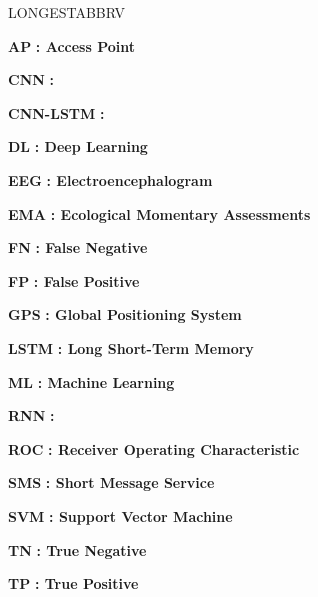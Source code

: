 \begin{theglossary}{LONGESTABBRV}
\item[\bf AP] \bf{:} \normalfont Access Point
\item[\bf CNN] \bf{:} 
\item[\bf CNN-LSTM] \bf{:} 
\item[\bf DL] \bf{:} \normalfont Deep Learning
\item[\bf EEG] \bf{:} \normalfont Electroencephalogram
\item[\bf EMA] \bf{:} \normalfont Ecological Momentary Assessments
\item[\bf FN] \bf{:} \normalfont False Negative
\item[\bf FP] \bf{:} \normalfont False Positive
\item[\bf GPS] \bf{:} \normalfont Global Positioning System
\item[\bf LSTM] \bf{:} \normalfont Long Short-Term Memory
\item[\bf ML] \bf{:} \normalfont Machine Learning
\item[\bf RNN] \bf{:} 
\item[\bf ROC] \bf{:} \normalfont Receiver Operating Characteristic
\item[\bf SMS] \bf{:} \normalfont Short Message Service
\item[\bf SVM] \bf{:} \normalfont Support Vector Machine
\item[\bf TN] \bf{:} \normalfont True Negative
\item[\bf TP] \bf{:} \normalfont True Positive

\end{theglossary}
